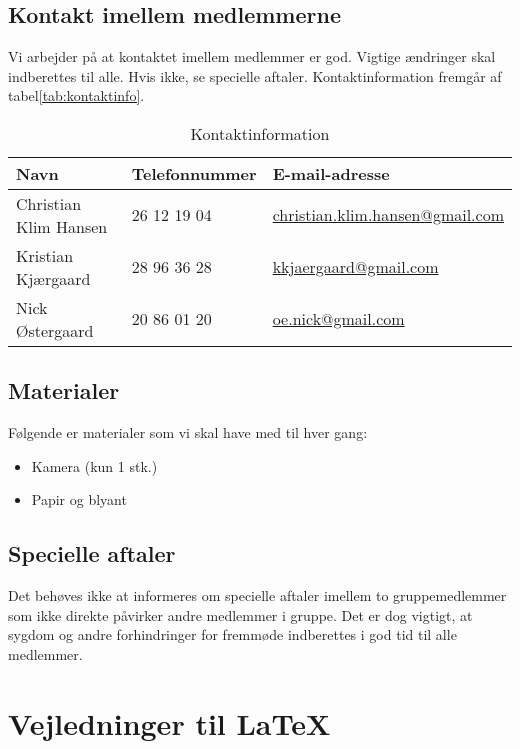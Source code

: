 \documentclass[simple,final]{../mypaper}
\begin{document}
\section{Kontakt imellem medlemmerne}

Vi arbejder på at kontaktet imellem medlemmer er god. Vigtige
ændringer skal indberettes til alle. Hvis ikke, se specielle
aftaler. Kontaktinformation fremgår af tabel\vref{tab:kontaktinfo}.

\begin{table}[htbp]
  \centering
  \caption{Kontaktinformation}
  \label{tab:kontaktinfo}
  \begin{tabular}{lll}
    \hline
    Navn & Telefonnummer & E-mail-adresse \\
    \hline
    Christian Klim Hansen & 26 12 19 04  & \url{christian.klim.hansen@gmail.com} \\
    Kristian Kjærgaard & 28 96 36 28  & \url{kkjaergaard@gmail.com} \\
    Nick Østergaard & 20 86 01 20  & \url{oe.nick@gmail.com} \\
    \hline
  \end{tabular}
\end{table}


\section{Materialer}

Følgende er materialer som vi skal have med til hver gang:

\begin{itemize}
\item Kamera (kun 1 stk.)
\item Papir og blyant
\end{itemize}


\section{Specielle aftaler}

Det behøves ikke at informeres om specielle aftaler imellem to
gruppemedlemmer som ikke direkte påvirker andre medlemmer i
gruppe. Det er dog vigtigt, at sygdom og andre forhindringer for
fremmøde indberettes i god tid til alle medlemmer.


\chapter{Vejledninger til \LaTeX}
\end{document}
